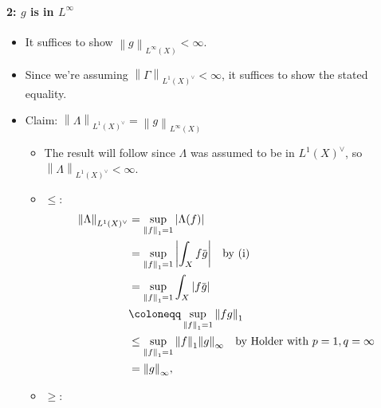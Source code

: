 \begin{solution}
\hypertarget{g-is-in-linfty}{%
\paragraph{\texorpdfstring{2: \(g\) is in
\(L^\infty\)}{2: g is in L\^{}\textbackslash infty}}\label{g-is-in-linfty}}

\begin{itemize}
\item
  It suffices to show
  \({\left\lVert {g} \right\rVert}_{L^\infty(X)} < \infty\).
\item
  Since we're assuming
  \({\left\lVert {\Gamma} \right\rVert}_{L^1(X)^\vee} < \infty\), it
  suffices to show the stated equality.
\item
  Claim:
  \({\left\lVert {\Lambda} \right\rVert}_{L^1(X)^\vee} ={\left\lVert {g} \right\rVert}_{L^\infty(X)}\)

  \begin{itemize}
  \item
    The result will follow since \(\Lambda\) was assumed to be in
    \(L^1(X)^\vee\), so
    \({\left\lVert {\Lambda} \right\rVert}_{L^1(X)^\vee} < \infty\).
  \item
    \(\leq\):
    \begin{align*}
    {\left\lVert {\Lambda} \right\rVert}_{L^1(X)^\vee} 
    &= \sup_{{\left\lVert {f} \right\rVert}_1 = 1} {\left\lvert {\Lambda(f)} \right\rvert} \\
    &= \sup_{{\left\lVert {f} \right\rVert}_1 = 1} {\left\lvert {\int_X f \mkern 1.5mu\overline{\mkern-1.5mug\mkern-1.5mu}\mkern 1.5mu} \right\rvert} \quad\text{by (i)}\\
    &= \sup_{{\left\lVert {f} \right\rVert}_1 = 1} \int_X {\left\lvert {f \mkern 1.5mu\overline{\mkern-1.5mug\mkern-1.5mu}\mkern 1.5mu} \right\rvert} \\
    &\coloneqq\sup_{{\left\lVert {f} \right\rVert}_1 = 1} {\left\lVert {fg} \right\rVert}_1 \\
    &\leq \sup_{{\left\lVert {f} \right\rVert}_1 = 1} {\left\lVert {f} \right\rVert}_1 {\left\lVert {g} \right\rVert}_\infty \quad\text{by Holder with } p=1,q=\infty\\
    &= {\left\lVert {g} \right\rVert}_\infty
    ,\end{align*}
  \item
    \(\geq\):


\end{itemize}
\end{itemize}
\end{solution}
